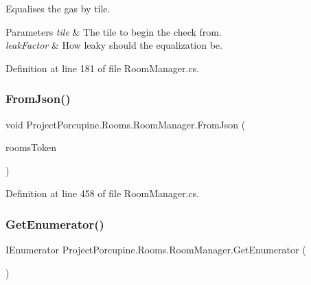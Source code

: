 Equalises the gas by tile. 


\begin{DoxyParams}{Parameters}
{\em tile} & The tile to begin the check from.\\
\hline
{\em leak\+Factor} & How leaky should the equalization be.\\
\hline
\end{DoxyParams}


Definition at line 181 of file Room\+Manager.\+cs.

\mbox{\label{class_project_porcupine_1_1_rooms_1_1_room_manager_a20fabe9e69ef78996cc87aa0ccd69b9e}} 
\subsubsection{\texorpdfstring{From\+Json()}{FromJson()}}
{\footnotesize\ttfamily void Project\+Porcupine.\+Rooms.\+Room\+Manager.\+From\+Json (\begin{DoxyParamCaption}\item[{J\+Token}]{rooms\+Token }\end{DoxyParamCaption})}



Definition at line 458 of file Room\+Manager.\+cs.

\mbox{\label{class_project_porcupine_1_1_rooms_1_1_room_manager_a2c1e6804f4dcc26cb7f2aec59ddc286b}} 
\subsubsection{\texorpdfstring{Get\+Enumerator()}{GetEnumerator()}}
{\footnotesize\ttfamily I\+Enumerator Project\+Porcupine.\+Rooms.\+Room\+Manager.\+Get\+Enumerator (\begin{DoxyParamCaption}{ }\end{DoxyParamCaption})}



